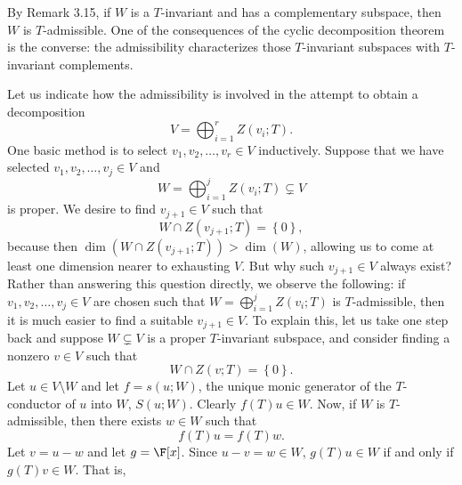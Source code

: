 \documentclass[linearalgebraII]{subfiles}
\begin{document}
    \begin{remark}
        By Remark 3.15, if $W$ is a $T$-invariant and has a complementary subspace, then $W$ is $T$-admissible. One of the consequences of the cyclic decomposition theorem is the converse: the admissibility characterizes those $T$-invariant subspaces with $T$-invariant complements.
    \end{remark}

    \begin{remark}
        Let us indicate how the admissibility is involved in the attempt to obtain a decomposition
        \begin{equation*}
            V = \bigoplus^{r}_{i=1} Z(v_i;T).
        \end{equation*}
        One basic method is to select $v_1, v_2, \ldots, v_r\in V$ inductively. Suppose that we have selected $v_1, v_2, \ldots, v_j\in V$ and
        \begin{equation*}
            W = \bigoplus^{j}_{i=1} Z(v_i;T)\subsetneq V
        \end{equation*}
        is proper. We desire to find $v_{j+1}\in V$ such that
        \begin{equation*}
            W\cap Z(v_{j+1};T) = \left\lbrace 0 \right\rbrace ,
        \end{equation*}
        because then $\dim\left(W\cap Z(v_{j+1};T) \right) > \dim(W)$, allowing us to come at least one dimension nearer to exhausting $V$. But why such $v_{j+1}\in V$ always exist? Rather than answering this question directly, we observe the following: if $v_1, v_2,\ldots, v_j\in V$ are chosen such that $W=\bigoplus^{j}_{i=1} Z(v_i;T)$ is $T$-admissible, then it is much easier to find a suitable $v_{j+1}\in V$. To explain this, let us take one step back and suppose $W\subsetneq V$ is a proper $T$-invariant subspace, and consider finding a nonzero $v\in V$ such that
        \begin{equation*}
            W\cap Z(v;T) = \left\lbrace 0 \right\rbrace .
        \end{equation*}
        Let $u\in V\setminus W$ and let $f=s(u;W)$, the unique monic generator of the $T$-conductor of $u$ into $W$, $S(u;W)$. Clearly $f(T)u\in W$. Now, if $W$ is $T$-admissible, then there exists $w\in W$ such that
        \begin{equation*}
            f(T)u = f(T)w.
        \end{equation*}
        Let $v=u-w$ and let $g=\F[x]$. Since $u-v=w\in W$, $g(T)u\in W$ if and only if $g(T)v\in W$. That is,

\end{remark}
\end{document}
